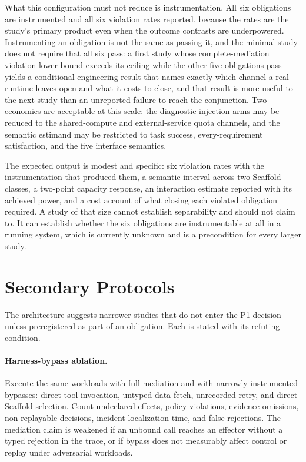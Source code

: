 What this configuration must not reduce is instrumentation. All six obligations are instrumented and all six violation rates reported, because the rates are the study's primary product even when the outcome contrasts are underpowered. Instrumenting an obligation is not the same as passing it, and the minimal study does not require that all six pass: a first study whose complete-mediation violation lower bound exceeds its ceiling while the other five obligations pass yields a conditional-engineering result that names exactly which channel a real runtime leaves open and what it costs to close, and that result is more useful to the next study than an unreported failure to reach the conjunction. Two economies are acceptable at this scale: the diagnostic injection arms may be reduced to the shared-compute and external-service quota channels, and the semantic estimand may be restricted to task success, every-requirement satisfaction, and the five interface semantics.

The expected output is modest and specific: six violation rates with the instrumentation that produced them, a semantic interval across two Scaffold classes, a two-point capacity response, an interaction estimate reported with its achieved power, and a cost account of what closing each violated obligation required. A study of that size cannot establish separability and should not claim to. It can establish whether the six obligations are instrumentable at all in a running system, which is currently unknown and is a precondition for every larger study.

\section{Secondary Protocols}
\label{sec:secondary}

The architecture suggests narrower studies that do not enter the P1 decision unless preregistered as part of an obligation. Each is stated with its refuting condition.

\paragraph{Harness-bypass ablation.}
Execute the same workloads with full mediation and with narrowly instrumented bypasses: direct tool invocation, untyped data fetch, unrecorded retry, and direct Scaffold selection. Count undeclared effects, policy violations, evidence omissions, non-replayable decisions, incident localization time, and false rejections. The mediation claim is weakened if an unbound call reaches an effector without a typed rejection in the trace, or if bypass does not measurably affect control or replay under adversarial workloads.


